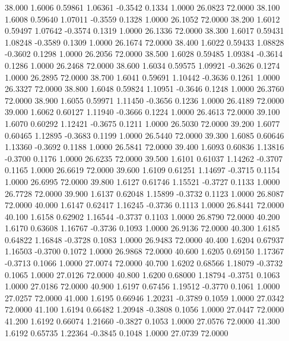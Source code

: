  38.000   1.6006   0.59861   1.06361  -0.3542   0.1334   1.0000  26.0823  72.0000
  38.100   1.6008   0.59640   1.07011  -0.3559   0.1328   1.0000  26.1052  72.0000
  38.200   1.6012   0.59497   1.07642  -0.3574   0.1319   1.0000  26.1336  72.0000
  38.300   1.6017   0.59431   1.08248  -0.3589   0.1309   1.0000  26.1674  72.0000
  38.400   1.6022   0.59433   1.08828  -0.3602   0.1298   1.0000  26.2056  72.0000
  38.500   1.6028   0.59485   1.09384  -0.3614   0.1286   1.0000  26.2468  72.0000
  38.600   1.6034   0.59575   1.09921  -0.3626   0.1274   1.0000  26.2895  72.0000
  38.700   1.6041   0.59691   1.10442  -0.3636   0.1261   1.0000  26.3327  72.0000
  38.800   1.6048   0.59824   1.10951  -0.3646   0.1248   1.0000  26.3760  72.0000
  38.900   1.6055   0.59971   1.11450  -0.3656   0.1236   1.0000  26.4189  72.0000
  39.000   1.6062   0.60127   1.11940  -0.3666   0.1224   1.0000  26.4613  72.0000
  39.100   1.6070   0.60292   1.12421  -0.3675   0.1211   1.0000  26.5030  72.0000
  39.200   1.6077   0.60465   1.12895  -0.3683   0.1199   1.0000  26.5440  72.0000
  39.300   1.6085   0.60646   1.13360  -0.3692   0.1188   1.0000  26.5841  72.0000
  39.400   1.6093   0.60836   1.13816  -0.3700   0.1176   1.0000  26.6235  72.0000
  39.500   1.6101   0.61037   1.14262  -0.3707   0.1165   1.0000  26.6619  72.0000
  39.600   1.6109   0.61251   1.14697  -0.3715   0.1154   1.0000  26.6995  72.0000
  39.800   1.6127   0.61746   1.15521  -0.3727   0.1133   1.0000  26.7728  72.0000
  39.900   1.6137   0.62048   1.15899  -0.3732   0.1123   1.0000  26.8087  72.0000
  40.000   1.6147   0.62417   1.16245  -0.3736   0.1113   1.0000  26.8441  72.0000
  40.100   1.6158   0.62902   1.16544  -0.3737   0.1103   1.0000  26.8790  72.0000
  40.200   1.6170   0.63608   1.16767  -0.3736   0.1093   1.0000  26.9136  72.0000
  40.300   1.6185   0.64822   1.16848  -0.3728   0.1083   1.0000  26.9483  72.0000
  40.400   1.6204   0.67937   1.16503  -0.3700   0.1072   1.0000  26.9868  72.0000
  40.600   1.6205   0.69150   1.17367  -0.3713   0.1066   1.0000  27.0074  72.0000
  40.700   1.6202   0.68566   1.18079  -0.3732   0.1065   1.0000  27.0126  72.0000
  40.800   1.6200   0.68000   1.18794  -0.3751   0.1063   1.0000  27.0186  72.0000
  40.900   1.6197   0.67456   1.19512  -0.3770   0.1061   1.0000  27.0257  72.0000
  41.000   1.6195   0.66946   1.20231  -0.3789   0.1059   1.0000  27.0342  72.0000
  41.100   1.6194   0.66482   1.20948  -0.3808   0.1056   1.0000  27.0447  72.0000
  41.200   1.6192   0.66074   1.21660  -0.3827   0.1053   1.0000  27.0576  72.0000
  41.300   1.6192   0.65735   1.22364  -0.3845   0.1048   1.0000  27.0739  72.0000
